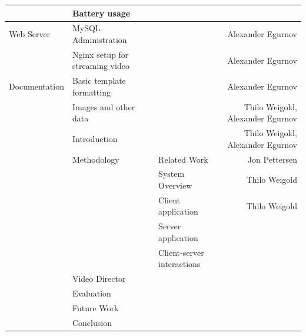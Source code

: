 \documentclass[conference]{IEEEtran}
\begin{document}
\begin{table}[t]
\begin{tabular}{lllr}
			& Battery usage & & \\
		\midrule
		Web Server
			& MySQL Administration & & Alexander Egurnov \\
			& Nginx setup for streaming video & & Alexander Egurnov \\
		\midrule
		Documentation 
			& Basic template formatting & & Alexander Egurnov \\
			& Images and other data & & Thilo Weigold, Alexander Egurnov \\
			& Introduction & & Thilo Weigold, Alexander Egurnov \\
			& Methodology & Related Work & Jon Pettersen \\
			&       & System Overview & Thilo Weigold \\
			&		& Client application & Thilo Weigold \\
			&		& Server application & \\
			&		& Client-server interactions & \\
			& Video Director & & \\
			& Evaluation & & \\
			& Future Work & & \\
			& Conclusion & & \\
		\bottomrule
    \end{tabular}%
\end{table}%

\vfill
\end{document}
